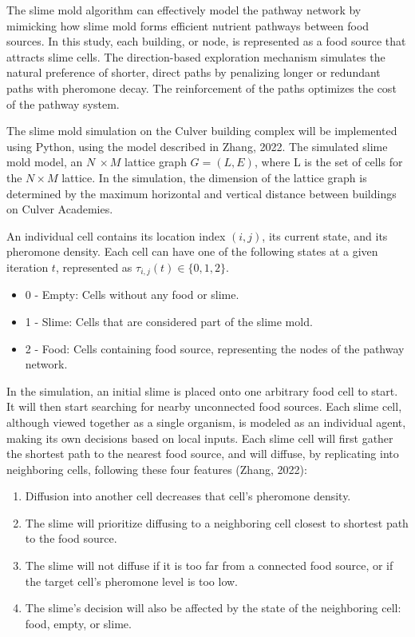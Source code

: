 \documentclass[11pt]{article}
\begin{document}
The slime mold algorithm can effectively model the pathway network by mimicking how slime mold forms efficient nutrient pathways between food sources. In this study, each building, or node, is represented as a food source that attracts slime cells. The direction-based exploration mechanism simulates the natural preference of shorter, direct paths by penalizing longer or redundant paths with pheromone decay. The reinforcement of the paths optimizes the cost of the pathway system. \par
The slime mold simulation on the Culver building complex will be implemented using Python, using the model described in Zhang, 2022. The simulated slime mold model, an $N\ \times M $ lattice graph $G=\left(L,E\right)$, where L is the set of cells for the $N \times M$ lattice. In the simulation, the dimension of the lattice graph is determined by the maximum horizontal and vertical distance between buildings on Culver Academies.  \par
An individual cell contains its location index $\left(i,j\right)$, its current state, and its pheromone density. Each cell can have one of the following states at a given iteration $t$, represented as $\tau_{i,j}\left(t\right)\in\{0,1,2\}$. \\
\begin{itemize}
\item 0 - Empty: Cells without any food or slime.
\item 1 - Slime: Cells that are considered part of the slime mold.
\item 2 - Food: Cells containing food source, representing the nodes of the pathway network. 
\end{itemize} \par
In the simulation, an initial slime is placed onto one arbitrary food cell to start. It will then start searching for nearby unconnected food sources. Each slime cell, although viewed together as a single organism, is modeled as an individual agent, making its own decisions based on local inputs. Each slime cell will first gather the shortest path to the nearest food source, and will diffuse, by replicating into neighboring cells, following these four features (Zhang, 2022):
\begin{enumerate}
\item Diffusion into another cell decreases that cell’s pheromone density. 
\item The slime will prioritize diffusing to a neighboring cell closest to shortest path to the food source. 
\item The slime will not diffuse if it is too far from a connected food source, or if the target cell’s pheromone level is too low. 
\item The slime’s decision will also be affected by the state of the neighboring cell: food, empty, or slime. 
\end{enumerate} \par
\end{document}
